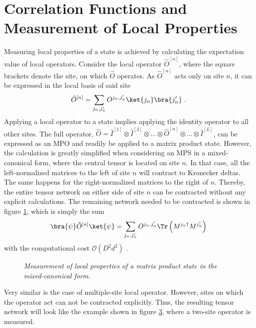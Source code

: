 \section{Correlation Functions and Measurement of Local Properties}
\label{sec:correlationFunctions}
Measuring local properties of a state is achieved by calculating the expectation value of local operators. Consider the local operator $\hat{O}^{[n]}$, where the square brackets denote the site, on which $\hat{O}$ operates. As $\hat{O}^{[n]}$ acts only on site $n$, it can be expressed in the local basis of said site
\begin{equation}
	\hat{O}^{[n]} = \sum_{j_n , j_n '} O^{j_n , j_n '} \ket{j_n} \bra{j_n '} \; .
	\label{eq:localOperator}
\end{equation}
Applying a local operator to a state implies applying the identity operator to all other sites. The full operator, $\hat{O} = \hat{I}^{[1]} \otimes \hat{I}^{[2]} \otimes \ldots \otimes \hat{O}^{[n]} \otimes \ldots \otimes \hat{I}^{[L]}$, can be expressed as an MPO and readily be applied to a matrix product state. However, the calculation is greatly simplified when considering an MPS in a mixed-canonical form, where the central tensor is located on site $n$. In that case, all the left-normalized matrices to the left of site $n$ will contract to Kronecker deltas. The same happens for the right-normalized matrices to the right of $n$. Thereby, the entire tensor network on either side of site $n$ can be contracted  without any explicit calculations. The remaining network needed to be contracted is shown in figure \ref{fig:SingleSiteOperator}, which is simply the sum
\begin{equation}
	\bra{\psi} \hat{O}^{[n]} \ket{\psi} = \sum_{j_n , j_n '} O^{j_n , j_n '} \Tr \left( M^{j_n \dag} M^{j_n '} \right) 
\end{equation}
with the computational cost $\mathcal{O}(D^2 d^2)$ \cite{schollwock}.
\begin{figure}[h!]
\centering %
\begin{subfigure}[b]{0.35\textwidth}
	\caption{}
  	
	\label{fig:SingleSiteOperator}
\end{subfigure}
\begin{subfigure}[b]{0.35\textwidth}
	\caption{}    
  	
	\label{fig:DoubleSiteOperator}
\end{subfigure}
\caption{\textit{Measurement of local properties of a matrix product state in the mixed-canonical form.}}
\end{figure}
Very similar is the case of multiple-site local operator. However, sites on which the operator act can not be contracted explicitly. Thus, the resulting tensor network will look like the example shown in figure \ref{fig:DoubleSiteOperator}, where a two-site operator is measured.\\

